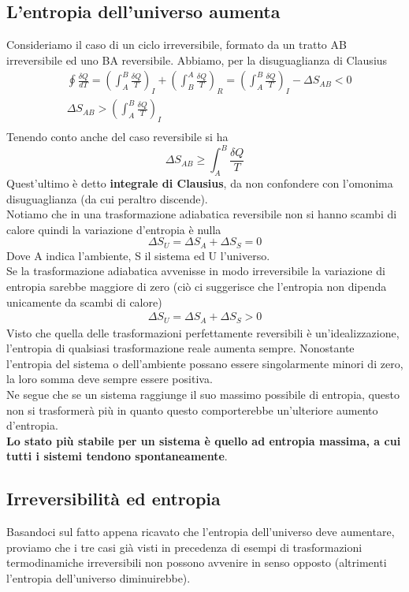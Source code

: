 \documentclass[10pt,a4paper]{article}
\begin{document}
\subsection{L'entropia dell'universo aumenta}
Consideriamo il caso di un ciclo irreversibile, formato da un tratto AB irreversibile ed uno BA reversibile. Abbiamo, per la disuguaglianza di Clausius
\begin{align*}
	&\oint \frac{\delta Q}{dT}=\left( \int_A^B  \frac{\delta Q}{T}\right)_I + \left(\int_B^A \frac{\delta Q}{T}\right)_R =\left(\int_A^B \frac{\delta Q}{T}\right)_I  - \Delta S_{AB} < 0\\
	&\Delta S_{AB} > \left(\int_A^B \frac{\delta Q}{T}\right)_I \\
\end{align*}Tenendo conto anche del caso reversibile si ha
\[\Delta S_{AB} \geq \int_A^B \frac{\delta Q}{T}\]
Quest'ultimo è detto \textbf{integrale di Clausius}, da non confondere con l'omonima disuguaglianza (da cui peraltro discende).\\
Notiamo che in una trasformazione adiabatica reversibile non si hanno scambi di calore quindi la variazione d'entropia è nulla
\[\Delta S_U = \Delta S_A + \Delta S_S = 0\]
Dove A indica l'ambiente, S il sistema ed U l'universo.\\
Se la trasformazione adiabatica avvenisse in modo irreversibile la variazione di entropia sarebbe maggiore di zero (ciò ci suggerisce che l'entropia non dipenda unicamente da scambi di calore)
\begin{align*}
	\Delta S_U = \Delta S_A + \Delta S_S > 0
\end{align*}
Visto che quella delle trasformazioni perfettamente reversibili è un'idealizzazione, l'entropia di qualsiasi trasformazione reale aumenta sempre. Nonostante l'entropia del sistema o dell'ambiente possano essere singolarmente minori di zero, la loro somma deve sempre essere positiva. \\
Ne segue che se un sistema raggiunge il suo massimo possibile di entropia, questo non si trasformerà più in quanto questo comporterebbe un'ulteriore aumento d'entropia.\\
\textbf{Lo stato più stabile per un sistema è quello ad entropia massima, a cui tutti i sistemi tendono spontaneamente}.
\subsection{Irreversibilità ed entropia}
Basandoci sul fatto appena ricavato che l'entropia dell'universo deve aumentare, proviamo che i tre casi già visti in precedenza di esempi di trasformazioni termodinamiche irreversibili non possono avvenire in senso opposto (altrimenti l'entropia dell'universo diminuirebbe). 
\end{document}
